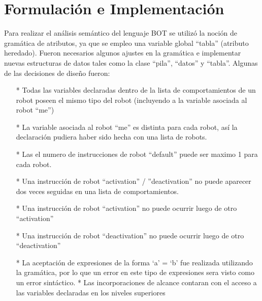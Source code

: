 \documentclass{article}
\begin{document}
		\section{Formulaci\'on e Implementaci\'on} 
Para realizar el análisis semántico del lenguaje BOT se utilizó la noción de gramática de atributos, ya que se empleo una variable global “tabla” (atributo heredado). Fueron necesarios algunos ajustes en la gramática e implementar nuevas estructuras de datos tales como la clase “pila”, “datos” y “tabla”. Algunas de las decisiones de diseño fueron:
\\
\begin{enumerate}
\item[*] Todas las variables declaradas dentro de la lista de comportamientos de un robot poseen el mismo tipo del robot (incluyendo a la variable asociada al robot “me”)
\item[*] La variable asociada al robot “me” es distinta para cada robot, así la declaración pudiera haber sido hecha con una lista de robots.
\item[*] Las el numero de instrucciones de robot “default” puede ser maximo 1 para cada robot.
\item[*] Una instrucción de robot “activation” / ”deactivation” no puede aparecer dos veces seguidas en una lista de comportamientos.
\item[*] Una instrucción de robot “activation” no puede ocurrir luego de otro “activation”
\item[*] Una instrucción de robot “deactivation” no puede ocurrir luego de otro “deactivation”
\item[*] La aceptación de expresiones de la forma `a' = `b' fue realizada utilizando la gramática, por lo que un error en este tipo de expresiones sera visto como un error sintáctico.
* Las incorporaciones de alcance contaran con el acceso a las variables declaradas en los niveles superiores
\end{enumerate}
		\newpage
\end{document}
